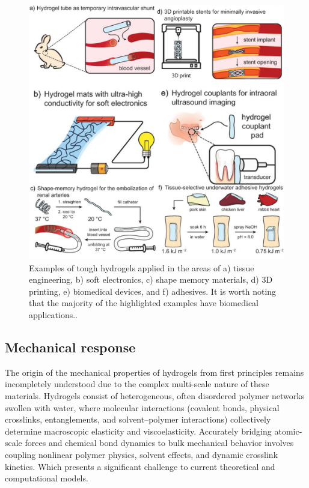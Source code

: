 \begin{figure}[ht!]
    \centering
    \includegraphics[width=12cm]{figs/applications.png}
    \caption{Examples of tough hydrogels applied in the areas of a) tissue engineering, b) soft electronics, c) shape memory materials, d) 3D printing, e) biomedical devices, and f) adhesives. 
    It is worth noting that the majority of the highlighted examples have biomedical applications.\citep{petelinsekToughHydrogelsLoadBearing2024}.}\label{fig:applications}
\end{figure}

\subsection{Mechanical response}

The origin of the mechanical properties of hydrogels from first principles remains incompletely understood due to the complex multi-scale nature of these materials\citep{senffTemperatureSensitiveMicrogel1999}.
Hydrogels consist of heterogeneous, often disordered polymer networks swollen with water, where molecular interactions (covalent bonds, physical crosslinks, entanglements, and solvent–polymer interactions) collectively determine macroscopic elasticity and viscoelasticity. 
Accurately bridging atomic-scale forces and chemical bond dynamics to bulk mechanical behavior involves coupling nonlinear polymer physics, solvent effects, and dynamic crosslink kinetics. 
Which presents a significant challenge to current theoretical and computational models. 


